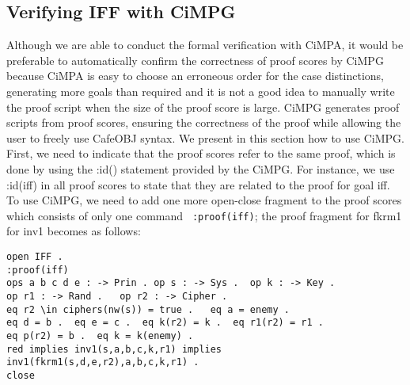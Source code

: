 \documentclass[a4paper,fleqn]{cas-dc}
\begin{document}
\subsection{Verifying IFF with CiMPG} \label{cimpg}
Although we are able to conduct the formal verification with
CiMPA, it would be preferable to automatically confirm the correctness of proof scores by CiMPG because CiMPA is easy to choose an erroneous order for the case distinctions, generating more goals than required and it is not a good idea to manually write the proof script when the size of the proof score is large. CiMPG generates proof scripts from proof scores, ensuring the correctness of the proof while allowing the user to freely use CafeOBJ syntax. We present in this section how to use CiMPG.
First, we need to indicate that the proof scores refer to the same proof, which is done by using the :id() statement provided by the CiMPG. For instance, we use :id(iff) in all proof scores to state that they are related to the proof for goal iff. 
To use CiMPG, we need to add one more open-close fragment to the proof scores which consists of only one command \verb! :proof(iff)!; the proof fragment for fkrm1 for inv1 becomes as follows:
\begin{verbatim}
open IFF .
:proof(iff)
ops a b c d e : -> Prin . op s : -> Sys .  op k : -> Key .  
op r1 : -> Rand .   op r2 : -> Cipher .
eq r2 \in ciphers(nw(s)) = true .   eq a = enemy .
eq d = b .  eq e = c .  eq k(r2) = k .  eq r1(r2) = r1 .    
eq p(r2) = b .  eq k = k(enemy) .
red implies inv1(s,a,b,c,k,r1) implies
inv1(fkrm1(s,d,e,r2),a,b,c,k,r1) .
close
\end{verbatim}
\end{document}
